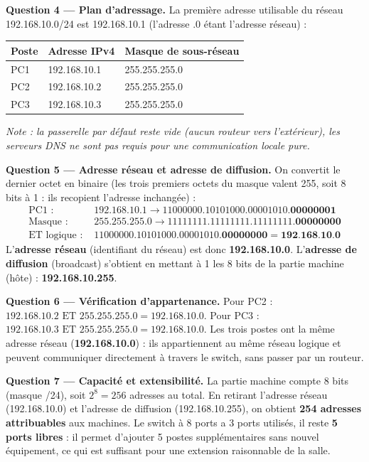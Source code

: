 \documentclass[11pt]{article}
\begin{document}
\begin{exoresolu}
\textbf{Question 4 — Plan d'adressage.} La première adresse utilisable du réseau 192.168.10.0/24 est 192.168.10.1 (l'adresse .0 étant l'adresse réseau) :

\begin{center}
\begin{tabular}{|l|l|l|}
\hline
\rowcolor{popblueL} \textbf{Poste} & \textbf{Adresse IPv4} & \textbf{Masque de sous-réseau} \\
\hline
PC1 & 192.168.10.1 & 255.255.255.0 \\
\hline
PC2 & 192.168.10.2 & 255.255.255.0 \\
\hline
PC3 & 192.168.10.3 & 255.255.255.0 \\
\hline
\end{tabular}
\end{center}
\textit{Note : la passerelle par défaut reste vide (aucun routeur vers l'extérieur), les serveurs DNS ne sont pas requis pour une communication locale pure.}

\textbf{Question 5 — Adresse réseau et adresse de diffusion.} On convertit le dernier octet en binaire (les trois premiers octets du masque valent 255, soit 8 bits à 1 : ils recopient l'adresse inchangée) :
\begin{align*}
\text{PC1 : }      & 192.168.10.1 \rightarrow 11000000.10101000.00001010.\mathbf{00000001} \\
\text{Masque : }   & 255.255.255.0 \rightarrow 11111111.11111111.11111111.\mathbf{00000000} \\
\text{ET logique : } & 11000000.10101000.00001010.\mathbf{00000000} = \textbf{192.168.10.0}
\end{align*}
L'\textbf{adresse réseau} (identifiant du réseau) est donc \textbf{192.168.10.0}.
L'\textbf{adresse de diffusion} (broadcast) s'obtient en mettant à 1 les 8 bits de la partie machine (hôte) : \textbf{192.168.10.255}.

\textbf{Question 6 — Vérification d'appartenance.} Pour PC2 : $192.168.10.2 \text{ ET } 255.255.255.0 = 192.168.10.0$. Pour PC3 : $192.168.10.3 \text{ ET } 255.255.255.0 = 192.168.10.0$. Les trois postes ont la même adresse réseau (\textbf{192.168.10.0}) : ils appartiennent au même réseau logique et peuvent communiquer directement à travers le switch, sans passer par un routeur.

\textbf{Question 7 — Capacité et extensibilité.} La partie machine compte 8 bits (masque /24), soit $2^{8} = 256$ adresses au total. En retirant l'adresse réseau (192.168.10.0) et l'adresse de diffusion (192.168.10.255), on obtient \textbf{254 adresses attribuables} aux machines. Le switch à 8 ports a 3 ports utilisés, il reste \textbf{5 ports libres} : il permet d'ajouter 5 postes supplémentaires sans nouvel équipement, ce qui est suffisant pour une extension raisonnable de la salle.


\end{exoresolu}
\end{document}

